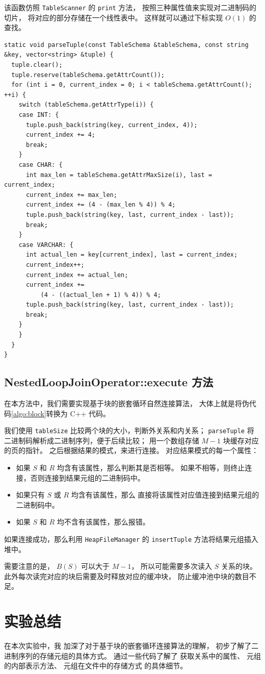 \documentclass[12pt,onecolumn]{report}
\theoremstyle{plain}
\numberwithin{figure}{chapter}
\numberwithin{table}{chapter}
\numberwithin{lstlisting}{chapter}
\begin{document}
该函数仿照 \lstinline|TableScanner| 的 \lstinline|print| 方法，
按照三种属性值来实现对二进制码的切片，
将对应的部分存储在一个线性表中。
这样就可以通过下标实现 $O(1)$ 的查找。

\begin{lstlisting}[caption=parseTuple 函数,
  basicstyle=\footnotesize\ttfamily,
  numberstyle=\footnotesize\color{darkgray}]
static void parseTuple(const TableSchema &tableSchema, const string &key, vector<string> &tuple) {
  tuple.clear();
  tuple.reserve(tableSchema.getAttrCount());
  for (int i = 0, current_index = 0; i < tableSchema.getAttrCount(); ++i) {
    switch (tableSchema.getAttrType(i)) {
    case INT: {
      tuple.push_back(string(key, current_index, 4));
      current_index += 4;
      break;
    }
    case CHAR: {
      int max_len = tableSchema.getAttrMaxSize(i), last = current_index;
      current_index += max_len;
      current_index += (4 - (max_len % 4)) % 4;
      tuple.push_back(string(key, last, current_index - last));
      break;
    }
    case VARCHAR: {
      int actual_len = key[current_index], last = current_index;
      current_index++;
      current_index += actual_len;
      current_index +=
          (4 - ((actual_len + 1) % 4)) % 4;
      tuple.push_back(string(key, last, current_index - last));
      break;
    }
    }
  }
}
\end{lstlisting}

\section{NestedLoopJoinOperator::execute 方法}
在本方法中，我们需要实现基于块的嵌套循环自然连接算法，
大体上就是将伪代码\ref{algo:block}转换为 C++ 代码。

我们使用
\lstinline|tableSize| 比较两个块的大小，判断外关系和内关系；
\lstinline|parseTuple| 将二进制码解析成二进制序列，便于后续比较；
用一个数组存储 $M - 1$ 块缓存对应的页的指针。
之后根据结果的模式，来进行连接。
对应结果模式的每一个属性：
\begin{itemize}[fullwidth,itemindent=\parindent]
\item
  如果 $S$ 和 $R$ 均含有该属性，那么判断其是否相等。
  如果不相等，则终止连接，否则连接到结果元组的二进制码中。
\item
  如果只有 $S$ 或 $R$ 均含有该属性，那么
  直接将该属性对应值连接到结果元组的二进制码中。
\item
  如果 $S$ 和 $R$ 均不含有该属性，那么报错。
\end{itemize}

如果连接成功，那么利用 \lstinline|HeapFileManager| 的
\lstinline|insertTuple| 方法将结果元组插入堆中。

需要注意的是， $B(S)$ 可以大于 $M - 1$，
所以可能需要多次读入 $S$ 关系的块。
此外每次读完对应的块后需要及时释放对应的缓冲块，
防止缓冲池中块的数目不足。

\chapter{实验总结}
在本次实验中，我
加深了对于基于块的嵌套循环连接算法的理解，
初步了解了二进制序列的存储元组的具体方式。
通过一些代码了解了
获取关系中的属性、
元组的内部表示方法、
元组在文件中的存储方式
的具体细节。
\end{document}
